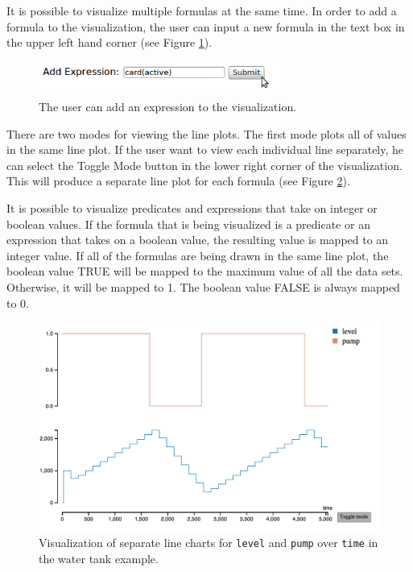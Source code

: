 It is possible to visualize multiple formulas at the same time. In order to add a formula to the visualization, the user can input a new formula in the text box in the upper left hand corner (see Figure \ref{timeVsValueUI}).

\begin{center}
\begin{figure}[h!]
\centering
\includegraphics[width=8cm]{bilder/timeVValueUI.png}
\caption{The user can add an expression to the visualization.}
\label{timeVsValueUI}
\end{figure}
\end{center}

There are two modes for viewing the line plots. The first mode plots all of values in the same line plot. If the user want to view each individual line separately, he can select the \textsf{Toggle Mode} button in the lower right corner of the visualization. This will produce a separate line plot for each formula (see Figure \ref{vOtEach}).

It is possible to visualize predicates and expressions that take on integer or boolean values. If the formula that is being visualized is a predicate or an expression that takes on a boolean value, the resulting value is mapped to an integer value. If all of the formulas are being drawn in the same line plot, the boolean value TRUE will be mapped to the maximum value of all the data sets. Otherwise, it will be mapped to 1. The boolean value FALSE is always mapped to 0.

\begin{center}
\begin{figure}[h!]
\centering
\includegraphics[width=15cm]{bilder/vOtEach.png}
\caption{Visualization of separate line charts for \texttt{level} and \texttt{pump} over \texttt{time} in the water tank example.}
\label{vOtEach}
\end{figure}
\end{center}